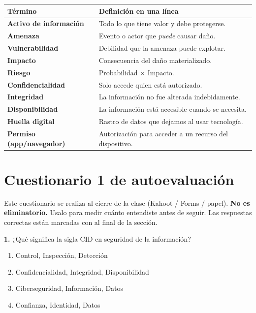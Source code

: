 \documentclass[12pt,a4paper]{article}
\begin{document}
\begin{table}[h!]
\centering
\renewcommand{\arraystretch}{1.4}
\begin{tabularx}{\textwidth}{>{\bfseries}p{4cm}X}
\toprule
Término & Definición en una línea \\
\midrule
Activo de información & Todo lo que tiene valor y debe protegerse. \\
Amenaza               & Evento o actor que \emph{puede} causar daño. \\
Vulnerabilidad        & Debilidad que la amenaza puede explotar. \\
Impacto               & Consecuencia del daño materializado. \\
Riesgo                & Probabilidad $\times$ Impacto. \\
Confidencialidad      & Solo accede quien está autorizado. \\
Integridad            & La información no fue alterada indebidamente. \\
Disponibilidad        & La información está accesible cuando se necesita. \\
Huella digital        & Rastro de datos que dejamos al usar tecnología. \\
Permiso (app/navegador) & Autorización para acceder a un recurso del dispositivo. \\
\bottomrule
\end{tabularx}
\end{table}

\newpage
\section{Cuestionario 1 de autoevaluación}

\begin{cajaNota}[title={Instrucciones}]
Este cuestionario se realiza al cierre de la clase (Kahoot / Forms / papel).
\textbf{No es eliminatorio.} Usalo para medir cuánto entendiste antes de seguir.
Las respuestas correctas están marcadas con  al final de la sección.
\end{cajaNota}

\vspace{6pt}

\textbf{1.} ¿Qué significa la sigla CID en seguridad de la información?
\begin{enumerate}[label=\alph*), leftmargin=2.5em]
  \item Control, Inspección, Detección
  \item Confidencialidad, Integridad, Disponibilidad
  \item Ciberseguridad, Información, Datos
  \item Confianza, Identidad, Datos
\end{enumerate}
\end{document}
